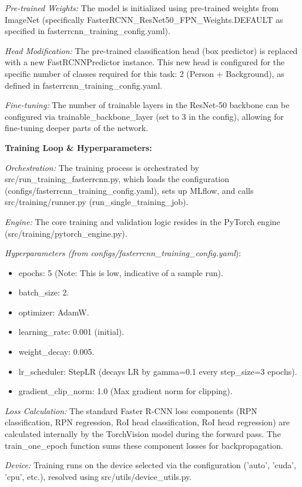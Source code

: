 \textit{Pre-trained Weights:} The model is initialized using pre-trained weights from ImageNet (specifically FasterRCNN\_ResNet50\_FPN\_Weights.DEFAULT as specified in fasterrcnn\_training\_config.yaml).

\textit{Head Modification:} The pre-trained classification head (box predictor) is replaced with a new {FastRCNNPredictor} instance. This new head is configured for the specific number of classes required for this task: 2 (Person + Background), as defined in fasterrcnn\_training\_config.yaml.

\textit{Fine-tuning:} The number of trainable layers in the ResNet-50 backbone can be configured via trainable\_backbone\_layer (set to 3 in the config), allowing for fine-tuning deeper parts of the network.

\textbf{Training Loop \& Hyperparameters:}

\textit{Orchestration:} The training process is orchestrated by src/run\_training\_fasterrcnn.py, which loads the configuration (configs/fasterrcnn\_training\_config.yaml), sets up MLflow, and calls src/training/runner.py (run\_single\_training\_job).

\textit{Engine:} The core training and validation logic resides in the PyTorch engine (src/training/pytorch\_engine.py).

\textit{Hyperparameters (from configs/fasterrcnn\_training\_config.yaml}):
\begin{itemize}
    \item epochs: 5 (Note: This is low, indicative of a sample run).
    \item batch\_size: 2.
    \item optimizer: AdamW.
    \item learning\_rate: 0.001 (initial).
    \item weight\_decay: 0.005.
    \item lr\_scheduler: StepLR (decays LR by gamma=0.1 every step\_size=3 epochs).
    \item gradient\_clip\_norm: 1.0 (Max gradient norm for clipping).
\end{itemize}

\textit{Loss Calculation:} The standard Faster R-CNN loss components (RPN classification, RPN regression, RoI head classification, RoI head regression) are calculated internally by the TorchVision model during the forward pass. The {train\_one\_epoch} function sums these component losses for backpropagation.

\textit{Device:} Training runs on the device selected via the configuration ('auto', 'cuda', 'cpu', etc.), resolved using src/utils/device\_utils.py.

